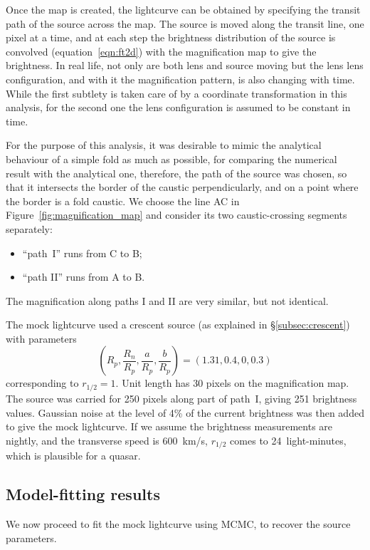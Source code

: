 \documentclass[usenatbib]{mn2e}
\begin{document}
Once the map is created, the lightcurve can be obtained by specifying
the transit path of the source across the map.  The source is moved
along the transit line, one pixel at a time, and at each step the
brightness distribution of the source is convolved
(equation~\ref{eqn:ft2d}) with the magnification map to give the
brightness.  In real life, not only are both lens and source moving
but the lens lens configuration, and with it the magnification
pattern, is also changing with time.  While the first subtlety is
taken care of by a coordinate transformation in this analysis, for the
second one the lens configuration is assumed to be constant in time.

For the purpose of this analysis, it was desirable to mimic the
analytical behaviour of a simple fold as much as possible, for
comparing the numerical result with the analytical one, therefore, the
path of the source was chosen, so that it intersects the border of the
caustic perpendicularly, and on a point where the border is a fold
caustic.  We choose the line AC in Figure~\ref{fig:magnification_map}
and consider its two caustic-crossing segments separately:
\begin{itemize}
\item ``path~I'' runs from C to B;
\item ``path II'' runs from A to B.
\end{itemize}
The magnification along paths I and II are very similar, but not
identical.

The mock lightcurve used a crescent source (as explained in
\S\ref{subsec:crescent}) with parameters
\begin{equation}
   \left(R_p, \frac{R_n}{R_p}, \frac{a}{R_p}, \frac{b}{R_p}\right) =
   (1.31, 0.4, 0, 0.3)
\label{eqn:cp}
\end{equation}
corresponding to $r_{1/2}=1$.  Unit length has 30 pixels on the
magnification map.  The source was carried for 250 pixels along part
of path~I, giving 251 brightness values.  Gaussian noise at the level
of 4\% of the current brightness was then added to give the mock
lightcurve.  If we assume the brightness measurements are nightly, and
the transverse speed is 600~km/s, $r_{1/2}$ comes to 24~light-minutes,
which is plausible for a quasar.

\subsection{Model-fitting results}

We now proceed to fit the mock lightcurve using MCMC, to recover the
source parameters.
\end{document}
